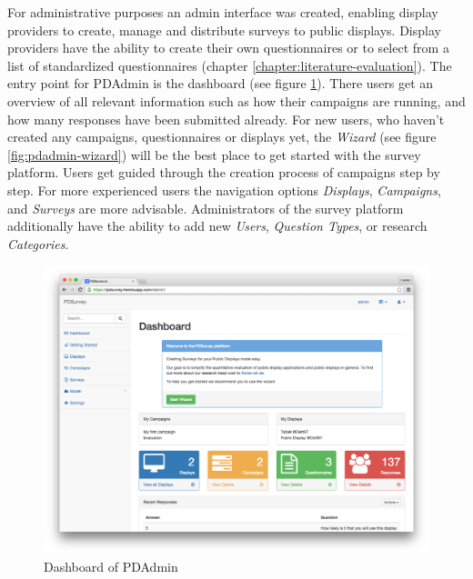 		For administrative purposes an admin interface was created, enabling display providers to create, manage and distribute surveys to public displays. Display providers have the ability to create their own questionnaires or to select from a list of standardized questionnaires (chapter \ref{chapter:literature-evaluation}).
		The entry point for PDAdmin is the dashboard (see figure \ref{fig:pdadmin-dashobard}). There users get an overview of all relevant information such as how their campaigns are running, and how many responses have been submitted already. 
		For new users, who haven't created any campaigns, questionnaires or displays yet, the \textit{Wizard} (see figure \ref{fig:pdadmin-wizard}) will be the best place to get started with the survey platform. Users get guided through the creation process of campaigns step by step.
		For more experienced users the navigation options \textit{Displays}, \textit{Campaigns}, and \textit{Surveys} are more advisable. 
		Administrators of the survey platform additionally have the ability to add new \textit{Users}, \textit{Question Types}, or research \textit{Categories}.


	\begin{figure}%
	    \begin{center}
	        \includegraphics[width=.7\columnwidth]{img/screenshots/pdadmin/dashboard.png}
	    \end{center}
	 \caption[PDAdmin Dashboard]{Dashboard of PDAdmin}
	 \label{fig:pdadmin-dashobard}
	\end{figure}

